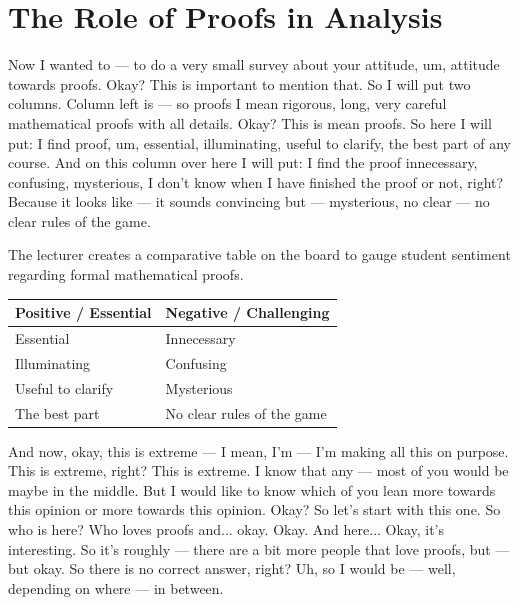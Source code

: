 \section*{The Role of Proofs in Analysis}

\begin{spoken-clean}[00:22:00 - 00:24:15]
Now I wanted to — to do a very small survey about your attitude, um, attitude towards proofs. Okay? This is important to mention that.  So I will put two columns. Column left is  — so proofs I mean rigorous, long, very careful mathematical proofs with all details. Okay? This is mean proofs. So here I will put: I find proof, um, essential, illuminating, useful to clarify, the best part of any course. And on this column over here I will put: I find the proof innecessary, confusing, mysterious, I don't know when I have finished the proof or not, right? Because it looks like — it sounds convincing but — mysterious, no clear — no clear rules of the game.
\end{spoken-clean}

\begin{math-stroke}
The lecturer creates a comparative table on the board to gauge student sentiment regarding formal mathematical proofs.
\begin{center}
\begin{tabular}{l | l}
\textbf{Positive / Essential} & \textbf{Negative / Challenging} \\ \hline
Essential & Innecessary \\
Illuminating & Confusing \\
Useful to clarify & Mysterious \\
The best part & No clear rules of the game
\end{tabular}
\end{center}
\end{math-stroke}

\begin{spoken-clean}[00:24:15 - 00:26:15]
And now, okay, this is extreme — I mean, I'm — I'm making all this on purpose. This is extreme, right? This is extreme. I know that any — most of you would be maybe in the middle. But I would like to know which of you lean more towards this opinion or more towards this opinion. Okay? So let's start with this one. So who is here? Who loves proofs and... okay.  Okay. And here...  Okay, it's interesting. So it's roughly — there are a bit more people that love proofs, but — but okay. So there is no correct answer, right? Uh, so I would be — well, depending on where — in between.
\end{spoken-clean}

